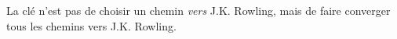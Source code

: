 La clé n'est pas de choisir un chemin \emph{vers} J.K. Rowling, mais de faire converger tous les chemins vers J.K. Rowling.

